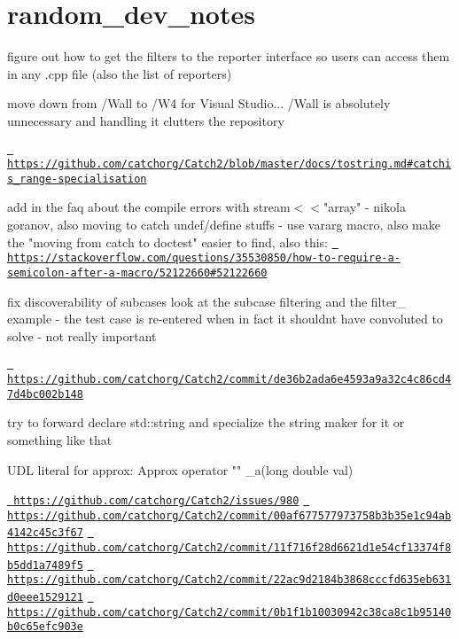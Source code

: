 \chapter{random\+\_\+dev\+\_\+notes}
\hypertarget{md_doctest_2scripts_2random__dev__notes}{}\label{md_doctest_2scripts_2random__dev__notes}
figure out how to get the filters to the reporter interface so users can access them in any .cpp file (also the list of reporters)

move down from /\+Wall to /\+W4 for Visual Studio... /\+Wall is absolutely unnecessary and handling it clutters the repository

\href{https://github.com/catchorg/Catch2/blob/master/docs/tostring.md\#catchis_range-specialisation}{\texttt{ https\+://github.\+com/catchorg/\+Catch2/blob/master/docs/tostring.\+md\#catchis\+\_\+range-\/specialisation}}

add in the faq about the compile errors with stream\texorpdfstring{$<$}{<}\texorpdfstring{$<$}{<}"{}array"{} -\/ nikola goranov, also moving to catch undef/define stuffs -\/ use vararg macro, also make the "{}moving from catch to doctest"{} easier to find, also this\+: \href{https://stackoverflow.com/questions/35530850/how-to-require-a-semicolon-after-a-macro/52122660\#52122660}{\texttt{ https\+://stackoverflow.\+com/questions/35530850/how-\/to-\/require-\/a-\/semicolon-\/after-\/a-\/macro/52122660\#52122660}}

fix discoverability of subcases look at the subcase filtering and the filter\+\_ example -\/ the test case is re-\/entered when in fact it shouldn\textquotesingle{}t have convoluted to solve -\/ not really important

\href{https://github.com/catchorg/Catch2/commit/de36b2ada6e4593a9a32c4c86cd47d4bc002b148}{\texttt{ https\+://github.\+com/catchorg/\+Catch2/commit/de36b2ada6e4593a9a32c4c86cd47d4bc002b148}}

try to forward declare std\+::string and specialize the string maker for it or something like that

UDL literal for approx\+: Approx operator "{}"{} \+\_\+a(long double val)

\href{https://github.com/catchorg/Catch2/issues/980}{\texttt{ https\+://github.\+com/catchorg/\+Catch2/issues/980}} \href{https://github.com/catchorg/Catch2/commit/00af677577973758b3b35e1c94ab4142c45c3f67}{\texttt{ https\+://github.\+com/catchorg/\+Catch2/commit/00af677577973758b3b35e1c94ab4142c45c3f67}} \href{https://github.com/catchorg/Catch2/commit/11f716f28d6621d1e54cf13374f8b5dd1a7489f5}{\texttt{ https\+://github.\+com/catchorg/\+Catch2/commit/11f716f28d6621d1e54cf13374f8b5dd1a7489f5}} \href{https://github.com/catchorg/Catch2/commit/22ac9d2184b3868cccfd635eb631d0eee1529121}{\texttt{ https\+://github.\+com/catchorg/\+Catch2/commit/22ac9d2184b3868cccfd635eb631d0eee1529121}} \href{https://github.com/catchorg/Catch2/commit/0b1f1b10030942c38ca8c1b95140b0c65efc903e}{\texttt{ https\+://github.\+com/catchorg/\+Catch2/commit/0b1f1b10030942c38ca8c1b95140b0c65efc903e}}

